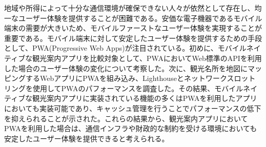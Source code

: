 地域や所得によって十分な通信環境が確保できない人々が依然として存在し、均一なユーザー体験を提供することが困難である。安価な電子機器であるモバイル端末の需要が大きいため、モバイルファーストなユーザー体験を実現することが重要である。モバイル端末に対して安定したユーザー体験を提供するための手段として、PWA(Progressive Web Apps)が注目されている。初めに、モバイルネイティブな観光案内アプリを比較対象として、PWAにおいてWeb標準のAPIを利用した場合のユーザー体験の変化について考察した。次に、観光名所を地図にマッピングするWebアプリにPWAを組み込み、Lighthouseとネットワークスロットリングを使用してPWAのパフォーマンスを調査した。その結果、モバイルネイティブな観光案内アプリに実装されている機能の多くはPWAを利用したアプリにおいても実装可能であり、キャッシュ管理を行うことでパフォーマンスの低下を抑えられることが示された。これらの結果から、観光案内アプリにおいてPWAを利用した場合は、通信インフラや財政的な制約を受ける環境においても安定したユーザー体験を提供できると考えられる。